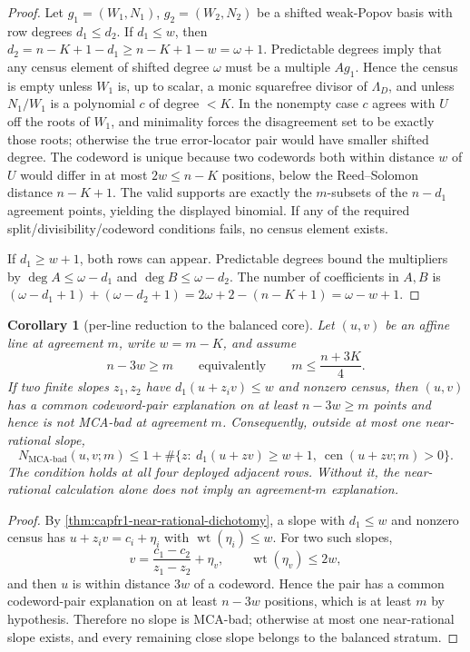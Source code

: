 \documentclass[11pt]{article}
\newtheorem{corollary}[corollary]{Corollary}
\theoremstyle{definition}
\theoremstyle{remark}
\providecommand{\wt}{\operatorname{wt}}
\providecommand{\Cen}{\operatorname{cen}}
\begin{document}
\begin{proof}
Let \(g_1=(W_1,N_1)\), \(g_2=(W_2,N_2)\) be a shifted weak-Popov basis with row degrees \(d_1\le d_2\).  If \(d_1\le w\), then \(d_2=n-K+1-d_1\ge n-K+1-w=\omega+1\).  Predictable degrees imply that any census element of shifted degree \(\omega\) must be a multiple \(Ag_1\).  Hence the census is empty unless \(W_1\) is, up to scalar, a monic squarefree divisor of \(\Lambda_D\), and unless \(N_1/W_1\) is a polynomial \(c\) of degree \(<K\).  In the nonempty case \(c\) agrees with \(U\) off the roots of \(W_1\), and minimality forces the disagreement set to be exactly those roots; otherwise the true error-locator pair would have smaller shifted degree.  The codeword is unique because two codewords both within distance \(w\) of \(U\) would differ in at most \(2w\le n-K\) positions, below the Reed--Solomon distance \(n-K+1\).  The valid supports are exactly the \(m\)-subsets of the \(n-d_1\) agreement points, yielding the displayed binomial.  If any of the required split/divisibility/codeword conditions fails, no census element exists.

If \(d_1\ge w+1\), both rows can appear.  Predictable degrees bound the multipliers by \(\deg A\le\omega-d_1\) and \(\deg B\le\omega-d_2\).  The number of coefficients in \(A,B\) is \((\omega-d_1+1)+(\omega-d_2+1)=2\omega+2-(n-K+1)=\omega-w+1\).
\end{proof}

\begin{corollary}[per-line reduction to the balanced core]\label{cor:capfr1-balanced-line}
Let $(u,v)$ be an affine line at agreement $m$, write $w=m-K$, and assume
\[
        n-3w\ge m
        \qquad\text{equivalently}\qquad
        m\le\frac{n+3K}{4}.
\]
If two finite slopes $z_1,z_2$ have $d_1(u+z_iv)\le w$ and nonzero census, then $(u,v)$ has a common codeword-pair explanation on at least $n-3w\ge m$ points and hence is not MCA-bad at agreement $m$.  Consequently, outside at most one near-rational slope,
\[
        N_{\mathrm{MCA\text{-}bad}}(u,v;m)
        \le
        1+\#\{z:\ d_1(u+zv)\ge w+1,\ \Cen(u+zv;m)>0\}.
\]
The condition holds at all four deployed adjacent rows.  Without it, the near-rational calculation alone does not imply an agreement-$m$ explanation.
\end{corollary}

\begin{proof}
By \cref{thm:capfr1-near-rational-dichotomy}, a slope with $d_1\le w$ and nonzero census has $u+z_iv=c_i+\eta_i$ with $\wt(\eta_i)\le w$.  For two such slopes,
\[
        v=\frac{c_1-c_2}{z_1-z_2}+\eta_v,
        \qquad \wt(\eta_v)\le2w,
\]
and then $u$ is within distance $3w$ of a codeword.  Hence the pair has a common codeword-pair explanation on at least $n-3w$ positions, which is at least $m$ by hypothesis.  Therefore no slope is MCA-bad; otherwise at most one near-rational slope exists, and every remaining close slope belongs to the balanced stratum.
\end{proof}
\end{document}

